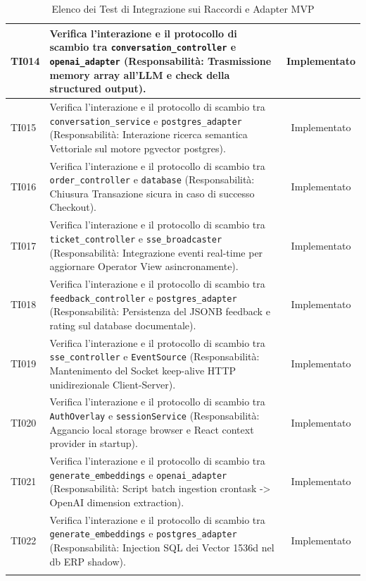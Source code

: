 \documentclass[a4paper,11pt,oneside]{scrartcl}
\begin{document}
\begin{longtable}{|p{1.9cm}|p{11.6cm}|c|}
    TI014           & Verifica l'interazione e il protocollo di scambio tra \texttt{conversation\_controller} e \texttt{openai\_adapter} (Responsabilità: Trasmissione memory array all'LLM e check della structured output).    & Implementato   \\ \hline
    TI015           & Verifica l'interazione e il protocollo di scambio tra \texttt{conversation\_service} e \texttt{postgres\_adapter} (Responsabilità: Interazione ricerca semantica Vettoriale sul motore pgvector postgres). & Implementato   \\ \hline
    TI016           & Verifica l'interazione e il protocollo di scambio tra \texttt{order\_controller} e \texttt{database} (Responsabilità: Chiusura Transazione sicura in caso di successo Checkout).                           & Implementato   \\ \hline
    TI017           & Verifica l'interazione e il protocollo di scambio tra \texttt{ticket\_controller} e \texttt{sse\_broadcaster} (Responsabilità: Integrazione eventi real-time per aggiornare Operator View asincronamente). & Implementato   \\ \hline
    TI018           & Verifica l'interazione e il protocollo di scambio tra \texttt{feedback\_controller} e \texttt{postgres\_adapter} (Responsabilità: Persistenza del JSONB feedback e rating sul database documentale).       & Implementato   \\ \hline
    TI019           & Verifica l'interazione e il protocollo di scambio tra \texttt{sse\_controller} e \texttt{EventSource} (Responsabilità: Mantenimento del Socket keep-alive HTTP unidirezionale Client-Server).              & Implementato   \\ \hline
    TI020           & Verifica l'interazione e il protocollo di scambio tra \texttt{AuthOverlay} e \texttt{sessionService} (Responsabilità: Aggancio local storage browser e React context provider in startup).                 & Implementato   \\ \hline
    TI021           & Verifica l'interazione e il protocollo di scambio tra \texttt{generate\_embeddings} e \texttt{openai\_adapter} (Responsabilità: Script batch ingestion crontask -> OpenAI dimension extraction).           & Implementato   \\ \hline
    TI022           & Verifica l'interazione e il protocollo di scambio tra \texttt{generate\_embeddings} e \texttt{postgres\_adapter} (Responsabilità: Injection SQL dei Vector 1536d nel db ERP shadow).                       & Implementato   \\ \hline
    \caption{Elenco dei Test di Integrazione sui Raccordi e Adapter MVP}
\end{longtable}
\end{document}
